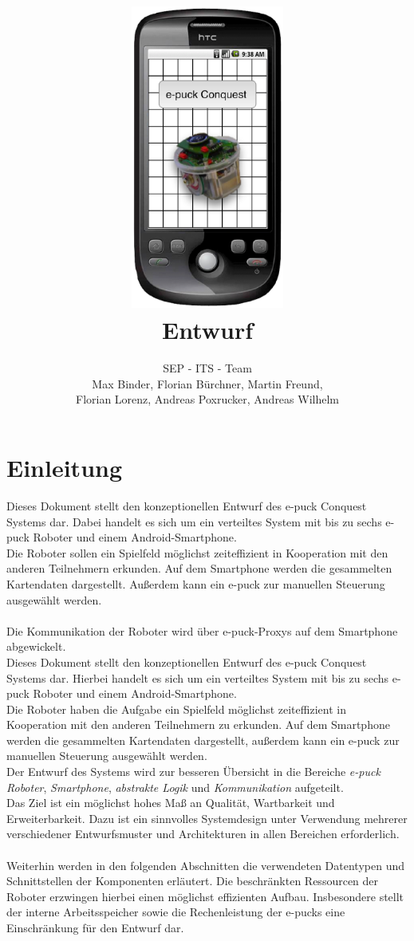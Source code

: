 \documentclass[10pt,a4paper]{article}
\title{
	\includegraphics[height=10cm]{logo.eps} \\
	\vspace{1cm}
	Entwurf
}
\author{SEP - ITS - Team \\ Max Binder, Florian Bürchner, Martin Freund, \\Florian Lorenz,
											Andreas Poxrucker, Andreas Wilhelm}
\let\oldsection\section
\renewcommand{\section}{\newpage \oldsection}
\begin{document}
	\maketitle
	\newpage
	\tableofcontents	
	\newpage

	\section{Einleitung}
		Dieses Dokument stellt den konzeptionellen Entwurf des e-puck Conquest Systems dar. Dabei handelt es sich um ein
		verteiltes System mit bis zu sechs e-puck Roboter und einem Android-Smartphone. \\
		Die Roboter sollen ein Spielfeld möglichst zeiteffizient in Kooperation mit den anderen Teilnehmern erkunden.
		Auf dem Smartphone werden die gesammelten Kartendaten dargestellt. Außerdem kann ein e-puck zur manuellen Steuerung
		ausgewählt werden. \\ \\
		Die Kommunikation der Roboter wird über e-puck-Proxys auf dem Smartphone abgewickelt.\\
		
		Dieses Dokument stellt den konzeptionellen Entwurf des e-puck Conquest Systems dar. Hierbei handelt es sich um ein
		verteiltes System mit bis zu sechs  e-puck Roboter und einem Android-Smartphone. \\
		Die Roboter haben die Aufgabe ein Spielfeld möglichst zeiteffizient in Kooperation mit den anderen Teilnehmern zu erkunden.
		Auf dem Smartphone werden die gesammelten Kartendaten dargestellt, außerdem kann ein e-puck zur manuellen Steuerung
		ausgewählt werden. \\
  		
		Der Entwurf des Systems wird zur besseren Übersicht in die Bereiche \textit{e-puck Roboter}, \textit{Smartphone}, \textit{abstrakte Logik}
		 und \textit{Kommunikation} aufgeteilt. \\
		Das Ziel ist ein möglichst hohes Maß an Qualität, Wartbarkeit und Erweiterbarkeit. Dazu ist ein sinnvolles Systemdesign unter
		Verwendung mehrerer verschiedener Entwurfsmuster und Architekturen in allen Bereichen erforderlich. \\ \\
		Weiterhin werden in den folgenden Abschnitten die verwendeten Datentypen und Schnittstellen der Komponenten erläutert. Die beschränkten
		Ressourcen der Roboter erzwingen hierbei einen möglichst effizienten Aufbau. Insbesondere stellt der interne
		Arbeitsspeicher sowie die Rechenleistung der e-pucks eine Einschränkung für den Entwurf dar.
				
\end{document}
